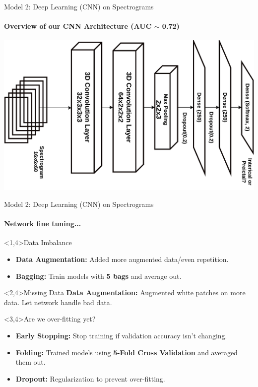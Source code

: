\documentclass{beamer}
\begin{document}
\begin{frame}{Model 2: Deep Learning (CNN) on Spectrograms}
  \framesubtitle{Overview of our CNN Architecture (AUC $\sim$ 0.72)}
  \begin{center}
  \includegraphics*[scale=0.175]{img/cnn_arch.png}
  \end{center}
\end{frame}



\begin{frame}{Model 2: Deep Learning (CNN) on Spectrograms}
  \framesubtitle{Network fine tuning...}

  \begin{block}<1,4>{Data Imbalance}
    \begin{itemize}
    \item \textbf{Data Augmentation:} Added more augmented data/even repetition.
    \item \textbf{Bagging:} Train models with \textbf{5 bags} and average out.
    \end{itemize}
  \end{block}
  
  \begin{block}<2,4>{Missing Data}
    \textbf{Data Augmentation:} Augmented white patches on more data. Let
    network handle bad data.
  \end{block}
 
  \begin{block}<3,4>{Are we over-fitting yet?}
    \begin{itemize}

\item     \textbf{Early Stopping:} Stop training if validation accuracy isn't
    changing.
    \item \textbf{Folding:} Trained models using \textbf{5-Fold Cross Validation} and
    averaged them out.
    \item \textbf{Dropout:} Regularization to prevent over-fitting.
    \end{itemize}
  \end{block}
\end{frame}
\end{document}
